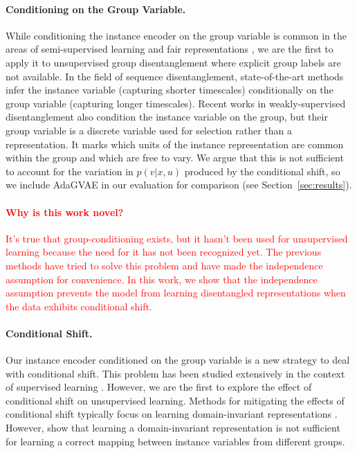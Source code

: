 \documentclass{article} %
\newcommand{\todo}[1]{\textcolor{red}{#1}}
\begin{document}
\paragraph{Conditioning on the Group Variable.} While conditioning the instance encoder on the group variable is common in the areas of semi-supervised learning and fair representations \citep{Kingma2014Semisupervised, Louizos2016TheVF}, we are the first to apply it to unsupervised group disentanglement where explicit group labels are not available. In the field of sequence disentanglement, state-of-the-art methods \citep{Hsu2017UnsupervisedLO, Denton2017UnsupervisedLO, Li2018DisentangledSA} infer the instance variable (capturing shorter timescales) conditionally on the group variable (capturing longer timescales). Recent works in weakly-supervised disentanglement \citep{Shu2020Weakly, Locatello2019ChallengingCA, Roeder2019Efficient} also condition the instance variable on the group, but their group variable is a discrete variable used for selection rather than a representation. It marks which units of the instance representation are common within the group and which are free to vary. We argue that this is not sufficient to account for the variation in $p(v | x, u)$ produced by the conditional shift, so we include AdaGVAE \citep{Locatello2020WeaklySupervisedDW} in our evaluation for comparison (see Section~\ref{sec:results}).

\todo{\paragraph{Why is this work novel?} It's true that group-conditioning exists, but it hasn't been used for unsupervised learning because the need for it has not been recognized yet. The previous methods have tried to solve this problem and have made the independence assumption for convenience. In this work, we show that the independence assumption prevents the model from learning disentangled representations when the data exhibits conditional shift.}

\paragraph{Conditional Shift.} Our instance encoder conditioned on the group variable is a new strategy to deal with conditional shift. This problem has been studied extensively in the context of supervised learning \citep{Zhang2013DomainAU, Gong2016Domain}. However, we are the first to explore the effect of conditional shift on unsupervised learning. Methods for mitigating the effects of conditional shift typically focus on learning domain-invariant representations \citep{BenDavid2009A}. However, \citet{Zhao2019On} show that learning a domain-invariant representation is not sufficient for learning a correct mapping between instance variables from different groups.
\end{document}

